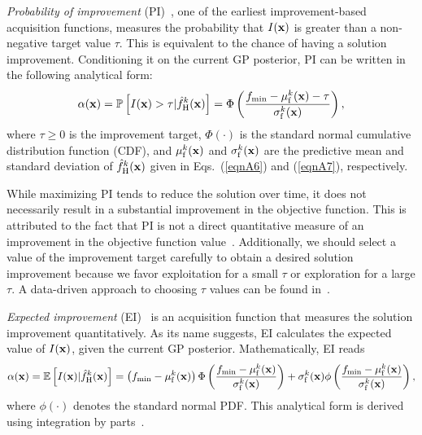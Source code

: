 \documentclass[journal ]{new-aiaa}
\newcommand{\edit}[1]{\textcolor{red}{#1}} %
\begin{document}
\textit{Probability of improvement} (PI)~\citep{Kushner1964}, one of the earliest improvement-based acquisition functions, measures the probability that $I({\bf x})$ is greater than a non-negative target value $\tau$.
This is equivalent to the chance of having a solution improvement.
Conditioning it on the current GP posterior, PI can be written in the following analytical form:
\begin{equation}\label{eqn38}
	\alpha({\bf x}) = \mathbb{P}\left[I({\bf x})>\tau|\hat{f}_\text{H}^k({\bf x})\right]=\Phi\left(\frac{f_\text{min}-\mu_\text{f}^k({\bf x})-\tau}{\sigma_\text{f}^k({\bf x})}\right),
\end{equation}
where %
{$\tau \geq 0$ is the improvement target}, $\Phi(\cdot)$ is the standard normal cumulative distribution function (CDF), and $\mu_\text{f}^k({\bf x})$ and $\sigma_\text{f}^k({\bf x})$ are the predictive mean and standard deviation of $\hat{f}_\text{H}^k({\bf x})$ given in Eqs.~(\ref{eqnA6}) and (\ref{eqnA7}), respectively.

While maximizing PI tends to reduce the solution over time, it does not necessarily result in a substantial improvement in the objective function.
This is attributed to the fact that PI is not a direct quantitative measure of an improvement in the objective function value~\citep{Kochenderfer2019}.
{Additionally, we should select a value of the improvement target carefully to obtain a desired solution improvement because we favor exploitation for a small $\tau$ or exploration for a large $\tau$.
A data-driven approach to choosing $\tau$ values can be found in~\citet{Jones2001}.}

\textit{Expected improvement} (EI)~\citep{Mockus1975,Jones1998} is an acquisition function that measures the solution improvement quantitatively.
As its name suggests, EI calculates the expected value of $I({\bf x})$, given the current GP posterior.
Mathematically, EI reads
\begin{equation}\label{eqn39}
		\alpha({\bf x})  = \mathbb{E}\left[I({\bf x})|\hat{f}_\text{H}^k({\bf x})\right]
		=\left( f_\text{min}-\mu_\text{f}^k({\bf x})\right)\Phi\left(\frac{f_\text{min}-\mu_\text{f}^k({\bf x})}{\sigma_\text{f}^k({\bf x})}\right)
	+\sigma_\text{f}^k({\bf x})\phi\left(\frac{f_\text{min}-\mu_\text{f}^k({\bf x})}{\sigma_\text{f}^k({\bf x})}\right),
\end{equation}
where $\phi(\cdot)$ denotes the standard normal PDF.
This analytical form is derived using integration by parts~\citep{Jones1998,Kochenderfer2019}.
\end{document}

